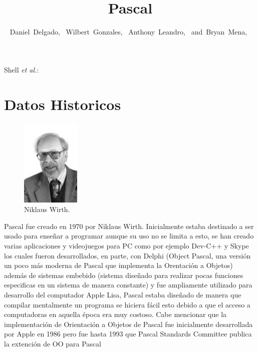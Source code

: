 \documentclass[10pt,journal,compsoc]{IEEEtran}
\begin{document}
\title{Pascal}

\author{Daniel~Delgado,~
	Wilbert~Gonzales,~
	Anthony~Leandro,~
	and~Bryan~Mena,~
}
{Shell \MakeLowercase{\textit{et al.}}: \LaTex}


\maketitle

\IEEEdisplaynontitleabstractindextext

\IEEEpeerreviewmaketitle

\section{Datos Historicos}
\begin{figure}
	\centering
	\includegraphics[width=0.25\textwidth]{wirth.jpg}
	\caption{\label{fig:NiklausWirth}Niklaus Wirth.}
\end{figure}
Pascal fue creado en 1970 por Niklaus Wirth. Inicialmente estaba destinado a ser usado para ense\~nar a programar aunque su uso no se limita a esto, se han creado varias aplicaciones y videojuegos para PC como por ejemplo Dev-C++ y Skype los cuales fueron desarrollados, en parte, con Delphi (Object Pascal, una versi\'on un poco m\'as moderna de Pascal que implementa la Orentaci\'on a Objetos) adem\'as de sistemas embebido (sistema dise\~nado para realizar pocas funciones especificas en un sistema de manera constante) y fue ampliamente utilizado para desarrollo del computador Apple Lisa, Pascal estaba dise\~nado de manera que compilar mentalmente un programa se hiciera f\'acil esto debido a que el acceso a computadoras en aquella \'epoca era muy costoso. Cabe mencionar que la implementaci\'on de Orientaci\'on a Objetos de Pascal fue inicialmente desarrollada por Apple en 1986 pero fue hasta 1993 que Pascal Standards Committee  publica la extenci\'on de OO para Pascal
\end{document}
